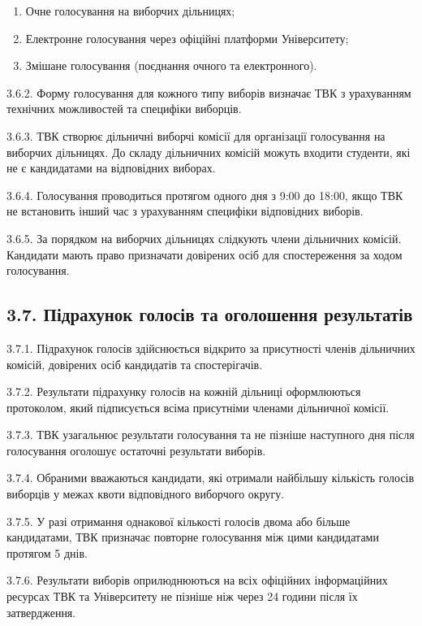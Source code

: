         \begin{enumerate}[label=\alph*)]
            \item Очне голосування на виборчих дільницях;
            \item Електронне голосування через офіційні платформи Університету;
            \item Змішане голосування (поєднання очного та електронного).
        \end{enumerate}

    3.6.2. Форму голосування для кожного типу виборів визначає ТВК з урахуванням технічних можливостей та специфіки виборців.

    3.6.3. ТВК створює дільничні виборчі комісії для організації голосування на виборчих дільницях. До складу дільничних комісій можуть входити студенти, які не є кандидатами на відповідних виборах.

    3.6.4. Голосування проводиться протягом одного дня з 9:00 до 18:00, якщо ТВК не встановить інший час з урахуванням специфіки відповідних виборів.

    3.6.5. За порядком на виборчих дільницях слідкують члени дільничних комісій. Кандидати мають право призначати довірених осіб для спостереження за ходом голосування.

\subsection*{3.7. Підрахунок голосів та оголошення результатів}
    3.7.1. Підрахунок голосів здійснюється відкрито за присутності членів дільничних комісій, довірених осіб кандидатів та спостерігачів.

    3.7.2. Результати підрахунку голосів на кожній дільниці оформлюються протоколом, який підписується всіма присутніми членами дільничної комісії.

    3.7.3. ТВК узагальнює результати голосування та не пізніше наступного дня після голосування оголошує остаточні результати виборів.

    3.7.4. Обраними вважаються кандидати, які отримали найбільшу кількість голосів виборців у межах квоти відповідного виборчого округу.

    3.7.5. У разі отримання однакової кількості голосів двома або більше кандидатами, ТВК призначає повторне голосування між цими кандидатами протягом 5 днів.

    3.7.6. Результати виборів оприлюднюються на всіх офіційних інформаційних ресурсах ТВК та Університету не пізніше ніж через 24 години після їх затвердження.